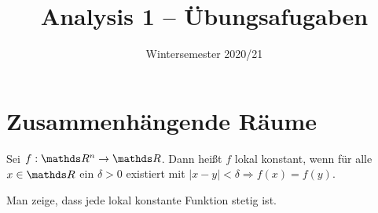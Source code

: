 \documentclass{scrartcl}
\title{Analysis 1 -- Übungsafugaben}
\date{Wintersemester 2020/21}
\author{}
\begin{document}
\maketitle
    \section*{Zusammenhängende Räume} 
    \begin{defn}
        Sei $f:\R^n\to \R$. Dann heißt $f$ lokal konstant, wenn für alle $x\in \R$ ein $\delta >0$ existiert mit $\vert x-y\vert<\delta \Rightarrow f(x)=f(y)$.   
    \end{defn}
    \begin{uea} Man zeige, dass jede lokal konstante Funktion stetig ist.
    \end{uea}
    
\end{document}
